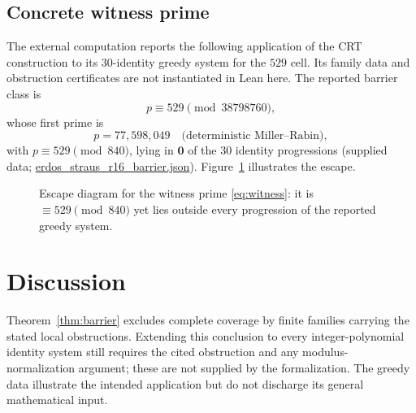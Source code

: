\documentclass[11pt,a4paper]{article}
\theoremstyle{definition}
\begin{document}
\subsection{Concrete witness prime}
\label{sec:witness}

The external computation reports the following application of the CRT
construction to its $30$-identity greedy system for the $529$ cell.
Its family data and obstruction certificates are not instantiated in
Lean here. The reported barrier class is
\begin{equation}
  \label{eq:barrierclass}
  p \equiv 529 \pmod{38798760},
\end{equation}
whose first prime is
\begin{equation}
  \label{eq:witness}
  p = 77{,}598{,}049 \quad\text{(deterministic Miller--Rabin)},
\end{equation}
with $p \equiv 529 \pmod{840}$, lying in $\mathbf{0}$ of the $30$
identity progressions (supplied data;
\url{erdos_straus_r16_barrier.json}). Figure~\ref{fig:witness}
illustrates the escape.

\begin{figure}[t]
  \centering
  \caption{Escape diagram for the witness prime \eqref{eq:witness}:
    it is $\equiv 529 \pmod{840}$ yet lies outside every progression of
    the reported greedy system.}
  \label{fig:witness}
\end{figure}

\section{Discussion}

Theorem~\ref{thm:barrier} excludes complete coverage by finite
families carrying the stated local obstructions. Extending this
conclusion to every integer-polynomial identity system still requires
the cited obstruction and any modulus-normalization argument; these
are not supplied by the formalization. The greedy data illustrate the
intended application but do not discharge its general mathematical input.
\end{document}

